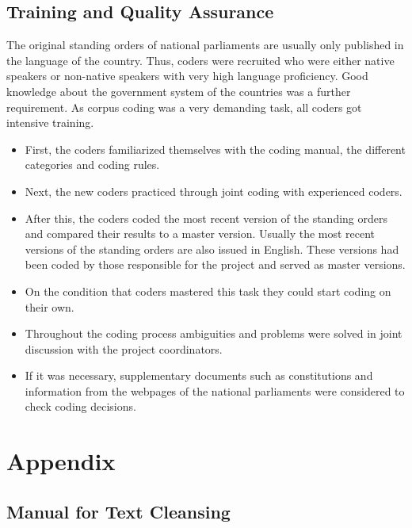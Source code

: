 \documentclass[10pt,]{article}
\providecommand{\tightlist}{%
  \setlength{\itemsep}{0pt}\setlength{\parskip}{0pt}}
\begin{document}
\subsection{Training and Quality
Assurance}\label{training-and-quality-assurance-1}

The original standing orders of national parliaments are usually only
published in the language of the country. Thus, coders were recruited
who were either native speakers or non-native speakers with very high
language proficiency. Good knowledge about the government system of the
countries was a further requirement. As corpus coding was a very
demanding task, all coders got intensive training.

\begin{itemize}
\tightlist
\item
  First, the coders familiarized themselves with the coding manual, the
  different categories and coding rules.
\item
  Next, the new coders practiced through joint coding with experienced
  coders.
\item
  After this, the coders coded the most recent version of the standing
  orders and compared their results to a master version. Usually the
  most recent versions of the standing orders are also issued in
  English. These versions had been coded by those responsible for the
  project and served as master versions.
\item
  On the condition that coders mastered this task they could start
  coding on their own.
\item
  Throughout the coding process ambiguities and problems were solved in
  joint discussion with the project coordinators.
\item
  If it was necessary, supplementary documents such as constitutions and
  information from the webpages of the national parliaments were
  considered to check coding decisions.
\end{itemize}

\newpage

\section{Appendix}\label{appendix}

\subsection{Manual for Text Cleansing}\label{manual-for-text-cleansing}
\end{document}
